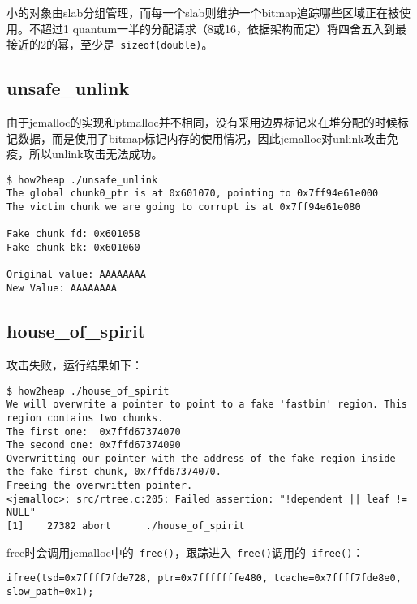 小的对象由slab分组管理，而每一个slab则维护一个bitmap追踪哪些区域正在被使用。不超过1 quantum一半的分配请求（8或16，依据架构而定）将四舍五入到最接近的2的幂，至少是\verb+ sizeof(double)+。

\subsection{unsafe\_unlink}

由于jemalloc的实现和ptmalloc并不相同，没有采用边界标记来在堆分配的时候标记数据，而是使用了bitmap标记内存的使用情况，因此jemalloc对unlink攻击免疫，所以unlink攻击无法成功。
\begin{verbatim}
$ how2heap ./unsafe_unlink
The global chunk0_ptr is at 0x601070, pointing to 0x7ff94e61e000
The victim chunk we are going to corrupt is at 0x7ff94e61e080

Fake chunk fd: 0x601058
Fake chunk bk: 0x601060

Original value: AAAAAAAA
New Value: AAAAAAAA

\end{verbatim}

\subsection{house\_of\_spirit}

攻击失败，运行结果如下：
\begin{verbatim}
$ how2heap ./house_of_spirit
We will overwrite a pointer to point to a fake 'fastbin' region. This region contains two chunks.
The first one:  0x7ffd67374070
The second one: 0x7ffd67374090
Overwritting our pointer with the address of the fake region inside the fake first chunk, 0x7ffd67374070.
Freeing the overwritten pointer.
<jemalloc>: src/rtree.c:205: Failed assertion: "!dependent || leaf != NULL"
[1]    27382 abort      ./house_of_spirit

\end{verbatim}

free时会调用jemalloc中的\verb+ free()+，跟踪进入\verb+ free()+调用的\verb+ ifree()+：
\begin{verbatim}
ifree(tsd=0x7ffff7fde728, ptr=0x7fffffffe480, tcache=0x7ffff7fde8e0, slow_path=0x1);
\end{verbatim}

